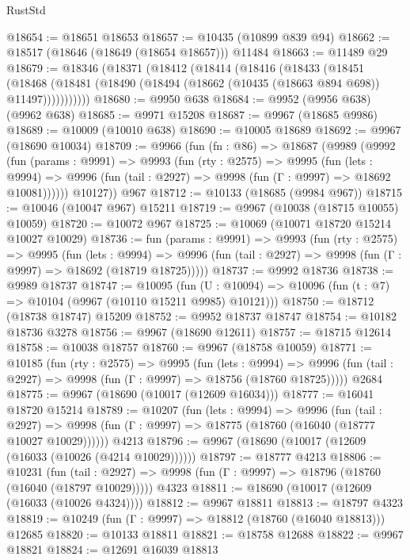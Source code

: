 \begin{lexlean}{RustStd}
\begin{coremodule}
{\begin{coremodule}
{{{{{{{{{{{{{{{{{{{{{{{{{{{{{{{{{{{{{{{{{{{{{{{{{{{{{{{{{{{{{{{{{{{{{{{{{{{{{{@18654 := @18651 @18653
@18657 := @10435 (@10899 @839 @94)
@18662 := @18517 (@18646 (@18649 (@18654 @18657))) @11484
@18663 := @11489 @29
@18679 := @18346
    (@18371
      (@18412
        (@18414
          (@18416
            (@18433
              (@18451
                (@18468
                  (@18481 (@18490 (@18494 (@18662 (@10435 (@18663 @894 @698)) @11497)))))))))))
@18680 := @9950 @638
@18684 := @9952 (@9956 @638) (@9962 @638)
@18685 := @9971 @15208
@18687 := @9967 (@18685 @9986)
@18689 := @10009 (@10010 @638)
@18690 := @10005 @18689
@18692 := @9967 (@18690 @10034)
@18709 := @9966
    (fun (fn : @86) =>
    @18687
      (@9989
        (@9992
          (fun (params : @9991) =>
          @9993
            (fun (rty : @2575) =>
            @9995
              (fun (lets : @9994) =>
              @9996 (fun (tail : @2927) => @9998 (fun (Γ : @9997) => @18692 @10081))))))
        @10127))
    @967
@18712 := @10133 (@18685 (@9984 @967))
@18715 := @10046 (@10047 @967) @15211
@18719 := @9967 (@10038 (@18715 @10055) @10059)
@18720 := @10072 @967
@18725 := @10069 (@10071 @18720 @15214 @10027 @10029)
@18736 := fun (params : @9991) =>
  @9993
    (fun (rty : @2575) =>
    @9995
      (fun (lets : @9994) =>
      @9996 (fun (tail : @2927) => @9998 (fun (Γ : @9997) => @18692 (@18719 @18725)))))
@18737 := @9992 @18736
@18738 := @9989 @18737
@18747 := @10095
    (fun (U : @10094) => @10096 (fun (t : @7) => @10104 (@9967 (@10110 @15211 @9985) @10121)))
@18750 := @18712 (@18738 @18747) @15209
@18752 := @9952 @18737 @18747
@18754 := @10182 @18736 @3278
@18756 := @9967 (@18690 @12611)
@18757 := @18715 @12614
@18758 := @10038 @18757
@18760 := @9967 (@18758 @10059)
@18771 := @10185
    (fun (rty : @2575) =>
    @9995
      (fun (lets : @9994) =>
      @9996 (fun (tail : @2927) => @9998 (fun (Γ : @9997) => @18756 (@18760 @18725)))))
    @2684
@18775 := @9967 (@18690 (@10017 (@12609 @16034)))
@18777 := @16041 @18720 @15214
@18789 := @10207
    (fun (lets : @9994) =>
    @9996
      (fun (tail : @2927) =>
      @9998 (fun (Γ : @9997) => @18775 (@18760 (@16040 (@18777 @10027 @10029))))))
    @4213
@18796 := @9967 (@18690 (@10017 (@12609 (@16033 (@10026 (@4214 @10029))))))
@18797 := @18777 @4213
@18806 := @10231
    (fun (tail : @2927) => @9998 (fun (Γ : @9997) => @18796 (@18760 (@16040 (@18797 @10029)))))
    @4323
@18811 := @18690 (@10017 (@12609 (@16033 (@10026 @4324))))
@18812 := @9967 @18811
@18813 := @18797 @4323
@18819 := @10249 (fun (Γ : @9997) => @18812 (@18760 (@16040 @18813))) @12685
@18820 := @10133 @18811
@18821 := @18758 @12688
@18822 := @9967 @18821
@18824 := @12691 @16039 @18813
}}}}}}}}}}}}}}}}}}}}}}}}}}}}}}}}}}}}}}}}}}}}}}}}}}}}}}}}}}}}}}}}}}}}}}}}}}}}}}
\end{coremodule}}
\end{coremodule}
\end{lexlean}
